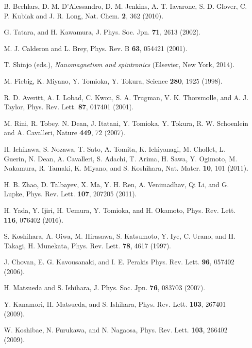 \documentclass[aps,twocolumn,showpacs,prl,amsmath,amssymb]{revtex4-1}
\begin{document}
\begin{thebibliography}{99}
B. Bechlars, D. M. D'Alessandro, D. M. Jenkins, A. T. Iavarone, S. D. Glover, C. P. Kubiak and J. R. Long, 
Nat. Chem. {\bf 2}, 362 (2010). 
%

G. Tatara, and H. Kawamura, 
J. Phys. Soc. Jpn. {\bf 71}, 2613 (2002). 

M. J. Calderon and L. Brey, 
Phys. Rev. B {\bf 63}, 054421 (2001). 

T. Shinjo (eds.),
{\it Nanomagnetism and spintronics}
(Elsevier, New York, 2014).


M. Fiebig, K. Miyano, Y. Tomioka, Y. Tokura, 
Science {\bf 280}, 1925 (1998). 

R. D. Averitt, A. I. Lobad, C. Kwon, S. A. Trugman, V. K. Thorsmolle, and A. J. Taylor, 
Phys. Rev. Lett. {\bf 87}, 017401 (2001). 

M. Rini, R. Tobey, N. Dean, J. Itatani, Y. Tomioka, Y. Tokura, R. W. Schoenlein and A. Cavalleri, 
Nature {\bf 449}, 72 (2007). 

H. Ichikawa, S. Nozawa, T. Sato, A. Tomita, K. Ichiyanagi, M. Chollet, L. Guerin, N. Dean, A. Cavalleri, S. Adachi, T. Arima, H. Sawa, Y. Ogimoto, M. Nakamura, R. Tamaki, K. Miyano, and S. Koshihara,
Nat. Mater. {\bf 10}, 101 (2011). 

H. B. Zhao, D. Talbayev, X. Ma, Y. H. Ren, A. Venimadhav, Qi Li, and G. Lupke, 
Phys. Rev. Lett. {\bf 107}, 207205 (2011). 

H. Yada, Y. Ijiri, H. Uemura, Y. Tomioka, and H. Okamoto, 
Phys. Rev. Lett. {\bf 116}, 076402 (2016). 

S. Koshihara, A. Oiwa, M. Hirasawa, S. Katsumoto, Y. Iye, C. Urano, and H. Takagi, H. Munekata, 
Phys. Rev. Lett. {\bf 78}, 4617 (1997). 


J. Chovan, E. G. Kavousanaki, and I. E. Perakis
Phys. Rev. Lett. {\bf 96}, 057402 (2006). 

H. Matsueda and S. Ishihara, 
J. Phys. Soc. Jpn. {\bf 76}, 083703 (2007).

Y. Kanamori, H. Matsueda, and S. Ishihara, 
Phys. Rev. Lett. {\bf 103}, 267401 (2009).

W. Koshibae, N. Furukawa, and N. Nagaosa, Phys. Rev. Lett. {\bf 103}, 266402 (2009).


\end{thebibliography}
\end{document}
